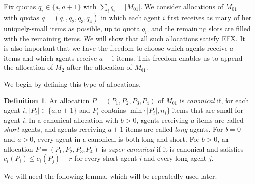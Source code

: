 \documentclass{article}
\theoremstyle{definition}
\newtheorem{definition}{Definition}
\begin{document}
Fix quotas $q_i\in\{a,a+1\}$ with $\sum_i q_i=|M_{01}|$. 
We consider allocations of $M_{01}$ with quotas $q=(q_1,q_2,q_3,q_4)$ in which each agent $i$ first receives as many of her uniquely-small items as possible, up to quota $q_i$, and the remaining slots are filled with the remaining items.
We will show that all such allocations satisfy EFX.
It is also important that we have the freedom to choose which agents receive $a$ items and which agents receive $a+1$ items.
This freedom enables us to append the allocation of $M_2$ after the allocation of $M_{01}$.

We begin by defining this type of allocations.

\begin{definition}
    An allocation $P=(P_1,P_2,P_3,P_4)$ of $M_{01}$ is \emph{canonical} if, for each agent $i$, $|P_i|\in\{a,a+1\}$ and $P_i$ contains $\min\{|P_i|, n_i\}$ items that are small for agent $i$.
    In a canonical allocation with $b>0$, agents receiving $a$ items are called \emph{short} agents, and agents receiving $a+1$ items are called \emph{long} agents.
    For $b=0$ and $a>0$, every agent in a canonical is both long and short.
    For $b>0$, an allocation $P=(P_1,P_2,P_3,P_4)$ is \emph{super-canonical} if it is canonical and satisfies $c_i(P_i)\leq c_i(P_j)-r$ for every short agent $i$ and every long agent $j$.
\end{definition}

We will need the following lemma, which will be repeatedly used later.
\end{document}
